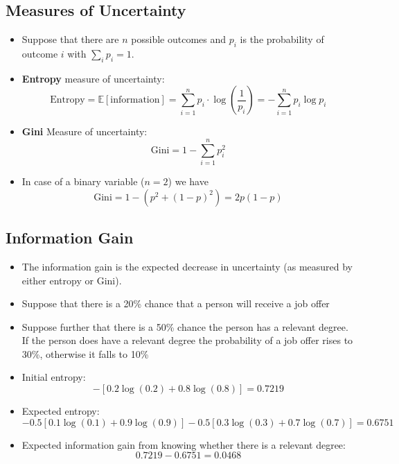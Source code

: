 \subsection{Measures of Uncertainty}
\begin{itemize}
    \item Suppose that there are $n$ possible outcomes and $p_{i}$ is the probability of outcome $i$ with $\sum _{i} p_{i} =1$.
    \item \textbf{Entropy} measure of uncertainty:
          \begin{equation*}
              \text{Entropy} =\mathbb{E}\left[\text{information}\right] =\sum _{i=1}^{n} p_{i} \cdot \log\left(\frac{1}{p_{i}}\right) =-\sum _{i=1}^{n} p_{i}\log p_{i}
          \end{equation*}
    \item \textbf{Gini} Measure of uncertainty:
          \begin{equation*}
              \text{Gini} =1-\sum _{i=1}^{n} p_{i}^{2}
          \end{equation*}
    \item In case of a binary variable ($n=2$) we have
          \begin{equation*}
              \text{Gini} =1-\left( p^{2} +\left( 1-p\right)^{2}\right) =2p\left( 1-p\right)
          \end{equation*}
\end{itemize}
\subsection{Information Gain}
\begin{itemize}
    \item The information gain is the expected decrease in uncertainty (as measured by either entropy or Gini).
    \item Suppose that there is a 20\% chance that a person will receive a job offer
    \item Suppose further that there is a 50\% chance the person has a relevant degree. If the person does have a relevant degree the probability of a job offer rises to 30\%, otherwise it falls to 10\%
    \item Initial entropy:
          \begin{equation*}
              -[ 0.2\log( 0.2) +0.8\log( 0.8)] =0.7219
          \end{equation*}
    \item Expected entropy:
          \begin{equation*}
              -0.5\left[ 0.1\log\left( 0.1\right) +0.9\log\left( 0.9\right)\right] -0.5\left[ 0.3\log\left( 0.3\right) +0.7\log\left( 0.7\right)\right] =0.6751\ \ \ \ 
          \end{equation*}
    \item Expected information gain from knowing whether there is a relevant degree:
          \begin{equation*}
              0.7219-0.6751=0.0468
          \end{equation*}
\end{itemize}
